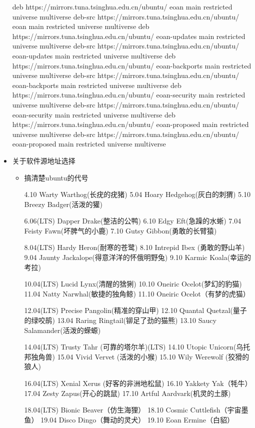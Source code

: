 \begin{itemize}
\begin{messagebox}
deb https://mirrors.tuna.tsinghua.edu.cn/ubuntu/ eoan main restricted universe multiverse
deb-src https://mirrors.tuna.tsinghua.edu.cn/ubuntu/ eoan main restricted universe multiverse
deb https://mirrors.tuna.tsinghua.edu.cn/ubuntu/ eoan-updates main restricted universe multiverse
deb-src https://mirrors.tuna.tsinghua.edu.cn/ubuntu/ eoan-updates main restricted universe multiverse
deb https://mirrors.tuna.tsinghua.edu.cn/ubuntu/ eoan-backports main restricted universe multiverse
deb-src https://mirrors.tuna.tsinghua.edu.cn/ubuntu/ eoan-backports main restricted universe multiverse
deb https://mirrors.tuna.tsinghua.edu.cn/ubuntu/ eoan-security main restricted universe multiverse
deb-src https://mirrors.tuna.tsinghua.edu.cn/ubuntu/ eoan-security main restricted universe multiverse
deb https://mirrors.tuna.tsinghua.edu.cn/ubuntu/ eoan-proposed main restricted universe multiverse
deb-src https://mirrors.tuna.tsinghua.edu.cn/ubuntu/ eoan-proposed main restricted universe multiverse
\end{messagebox}

\item {关于软件源地址选择}
\begin{itemize}
\item 搞清楚ubuntu的代号
\begin{messagebox}
4.10 Warty Warthog(长疣的疣猪)
5.04 Hoary Hedgehog(灰白的刺猬)
5.10 Breezy Badger(活泼的獾)

6.06(LTS) Dapper Drake(整洁的公鸭)
6.10 Edgy Eft(急躁的水蜥)
7.04 Feisty Fawn(坏脾气的小鹿)
7.10 Gutsy Gibbon(勇敢的长臂猿)

8.04(LTS) Hardy Heron(耐寒的苍鹭)
8.10 Intrepid Ibex (勇敢的野山羊)
9.04 Jaunty Jackalope(得意洋洋的怀俄明野兔)
9.10 Karmic Koala(幸运的考拉)

10.04(LTS) Lucid Lynx(清醒的猞猁)
10.10 Oneiric Ocelot(梦幻的豹猫)
11.04 Natty Narwhal(敏捷的独角鲸)
11.10 Oneiric Ocelot（有梦的虎猫）

12.04(LTS) Precise Pangolin(精准的穿山甲)
12.10 Quantal Quetzal(量子的绿咬鹃)
13.04 Raring Ringtail(铆足了劲的猫熊)
13.10 Saucy Salamander(活泼的蝾螈)

14.04(LTS) Trusty Tahr (可靠的塔尔羊)(LTS)
14.10 Utopic Unicorn(乌托邦独角兽)
15.04 Vivid Vervet (活泼的小猴)
15.10 Wily Werewolf (狡猾的狼人)

16.04(LTS) Xenial Xerus (好客的非洲地松鼠)
16.10 Yakkety Yak（牦牛）
17.04 Zesty Zapus(开心的跳鼠)
17.10 Artful Aardvark(机灵的土豚)

18.04(LTS) Bionic Beaver（仿生海狸）
18.10 Cosmic Cuttlefish（宇宙墨鱼）
19.04 Disco Dingo（舞动的灵犬）
19.10 Eoan Ermine（白貂）


\end{messagebox}
\end{itemize}
\end{itemize}
